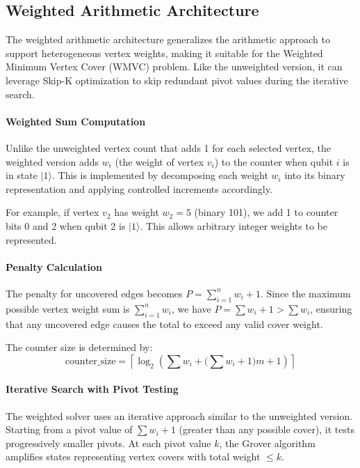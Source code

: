 \documentclass{ieeeaccess}
\begin{document}
\subsection{Weighted Arithmetic Architecture}

The weighted arithmetic architecture generalizes the
arithmetic approach to support heterogeneous vertex weights,
making it suitable for the Weighted Minimum Vertex Cover
(WMVC) problem. Like the unweighted version, it can leverage
Skip-K optimization to skip redundant pivot values during
the iterative search.

\paragraph{Weighted Sum Computation}
Unlike the unweighted vertex count that adds 1 for each
selected vertex, the weighted version adds $w_i$ (the weight
of vertex $v_i$) to the counter when qubit $i$ is in state
$|1\rangle$. This is implemented by decomposing each weight
$w_i$ into its binary representation and applying controlled
increments accordingly.

For example, if vertex $v_2$ has weight $w_2 = 5$
(binary 101), we add 1 to counter bits 0 and 2 when qubit 2
is $|1\rangle$. This allows arbitrary integer weights to be
represented.

\paragraph{Penalty Calculation}
The penalty for uncovered edges becomes
$P = \sum_{i=1}^{n} w_i + 1$. Since the maximum possible
vertex weight sum is $\sum_{i=1}^{n} w_i$, we have
$P = \sum w_i + 1 > \sum w_i$, ensuring that any uncovered
edge causes the total to exceed any valid cover weight.

The counter size is determined by:
\begin{equation}
    \mathrm{counter\_size}
    = \left\lceil\log_2\!\left(
        \textstyle\sum w_i
        + \bigl(\textstyle\sum w_i + 1\bigr)m + 1
      \right)\right\rceil
    \label{eq:weighted-counter-size}
\end{equation}

\paragraph{Iterative Search with Pivot Testing}
The weighted solver uses an iterative approach similar to the
unweighted version. Starting from a pivot value of
$\sum w_i + 1$ (greater than any possible cover), it tests
progressively smaller pivots. At each pivot value $k$, the
Grover algorithm amplifies states representing vertex covers
with total weight $\leq k$.
\end{document}
